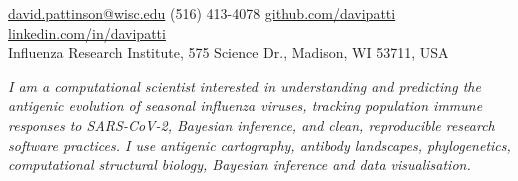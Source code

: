\documentclass[10pt,a4paper]{article}
\begin{document}
\sloppy  %


\nobreakvspace{0.3em}  %

\noindent\href{mailto:david.pattinson@wisc.edu}{david.pattinson\mbox{}@\mbox{}wisc.edu}\sbull
{} (516) 413-4078\sbull
\href{https://github.com/davipatti}{github.com/davipatti}\sbull
\href{http://linkedin.com/in/davipatti}{linkedin.com/in/davipatti}
\\
Influenza Research Institute, 575 Science Dr., Madison, WI 53711, USA

\spacedhrule{0.9em}{-0.4em}  %



\noindent \emph{I am a computational scientist interested in understanding and
  predicting the antigenic evolution of seasonal influenza viruses, tracking
  population immune responses to SARS-CoV-2, Bayesian inference, and clean,
  reproducible research software practices. I use antigenic cartography,
  antibody landscapes, phylogenetics, computational structural biology, Bayesian
  inference and data visualisation.}





\spacedhrule{0.9em}{-0.4em}

\end{document}
